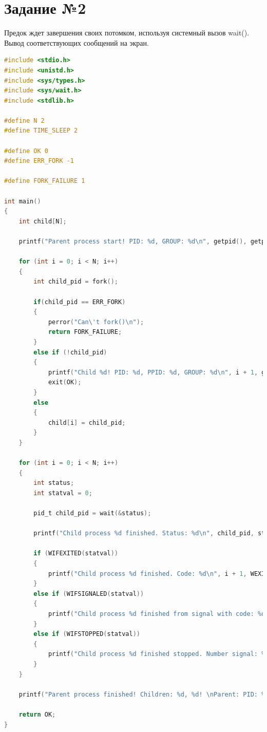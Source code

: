 \documentclass[12pt]{report}
\begin{document}
\section*{Задание №2}

Предок ждет завершения своих потомком, используя системный вызов
wait(). Вывод соответствующих сообщений на экран.

\begin{lstlisting}[label=some-code,caption=Вызов функции wait(),language=C]
#include <stdio.h>
#include <unistd.h>
#include <sys/types.h>
#include <sys/wait.h>
#include <stdlib.h>

#define N 2
#define TIME_SLEEP 2

#define OK 0
#define ERR_FORK -1

#define FORK_FAILURE 1

int main()
{
	int child[N];
	
	printf("Parent process start! PID: %d, GROUP: %d\n", getpid(), getpgrp());
	
	for (int i = 0; i < N; i++)
	{
		int child_pid = fork();
		
		if(child_pid == ERR_FORK)
		{
			perror("Can\'t fork()\n");
			return FORK_FAILURE;
		}
		else if (!child_pid)
		{
            printf("Child %d! PID: %d, PPID: %d, GROUP: %d\n", i + 1, getpid(), getppid(), getpgrp());
			exit(OK);
		}     
		else
		{
			child[i] = child_pid;
		}   
	}
	
	for (int i = 0; i < N; i++)
	{
		int status;
		int statval = 0;
		
		pid_t child_pid = wait(&status);
		
		printf("Child process %d finished. Status: %d\n", child_pid, status);
		
		if (WIFEXITED(statval))
		{
			printf("Child process %d finished. Code: %d\n", i + 1, WEXITSTATUS(statval));
		}
		else if (WIFSIGNALED(statval))
		{
			printf("Child process %d finished from signal with code: %d\n", i + 1, WTERMSIG(statval));
		}
		else if (WIFSTOPPED(statval))
		{
			printf("Child process %d finished stopped. Number signal: %d\n", i + 1, WSTOPSIG(statval));
		}
	}
	
	printf("Parent process finished! Children: %d, %d! \nParent: PID: %d, GROUP: %d\n ", child[0], child[1], getpid(), getpgrp());
	
	return OK;
}
\end{lstlisting}
\end{document}
